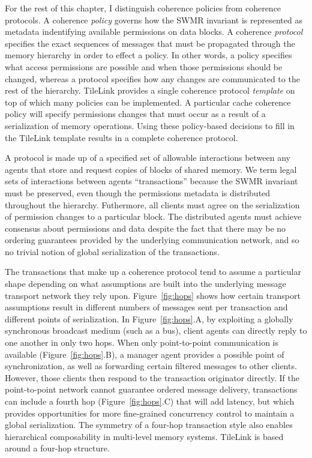 For the rest of this chapter, I distinguish coherence policies from coherence protocols.
A coherence {\em policy} governs how the SWMR invariant is represented as metadata indentifying available permissions on data blocks.
A coherence {\em protocol} specifies the exact sequences of messages that must be propagated through the memory hierarchy in order to effect a policy.
In other words, a policy specifies what access permissions are possible and when those permissions should be changed,
whereas a protocol specifies how any changes are communicated to the rest of the hierarchy.
TileLink provides a single coherence protocol {\em template} on top of which many policies can be implemented.
A particular cache coherence policy will specify permissions changes that must occur as a result of a serialization of memory operations.
Using these policy-based decisions to fill in the TileLink template results in a complete coherence protocol.

A protocol is made up of a specified set of allowable interactions between any agents that store and request copies of blocks of shared memory.
We term legal sets of interactions between agents ``transactions'' because the SWMR invariant must be preserved,
even though the permissions metadata is distributed throughout the hierarchy.
Futhermore, all clients must agree on the serialization of permission changes to a particular block.
The distributed agents must achieve consensus about permissions and data despite the fact that there may be no ordering guarantees
provided by the underlying communication network, and so no trivial notion of global serialization of the transactions.

The transactions that make up a coherence protocol tend to assume a particular shape depending on what
assumptions are built into the underlying message transport network they rely upon.
Figure~\ref{fig:hops} shows how certain transport assumptions result in different numbers of messages sent per transaction and different points of serialization.
In Figure~\ref{fig:hops}.A, by exploiting a globally synchronous broadcast medium (such as a bus), client agents can directly reply to one another in only two hops.
When only point-to-point communication is available (Figure~\ref{fig:hops}.B), a manager agent provides a possible point of synchronization, as well as forwarding certain filtered messages to other clients.
However, those clients then respond to the transaction originator directly.
If the point-to-point network cannot guarantee ordered message delivery, transactions can include a fourth hop (Figure~\ref{fig:hops}.C)
that will add latency, but which provides opportunities for more fine-grained concurrency control to maintain a global serialization.
The symmetry of a four-hop transaction style also enables hierarchical composability in multi-level memory systems.
TileLink is based around a four-hop structure.


